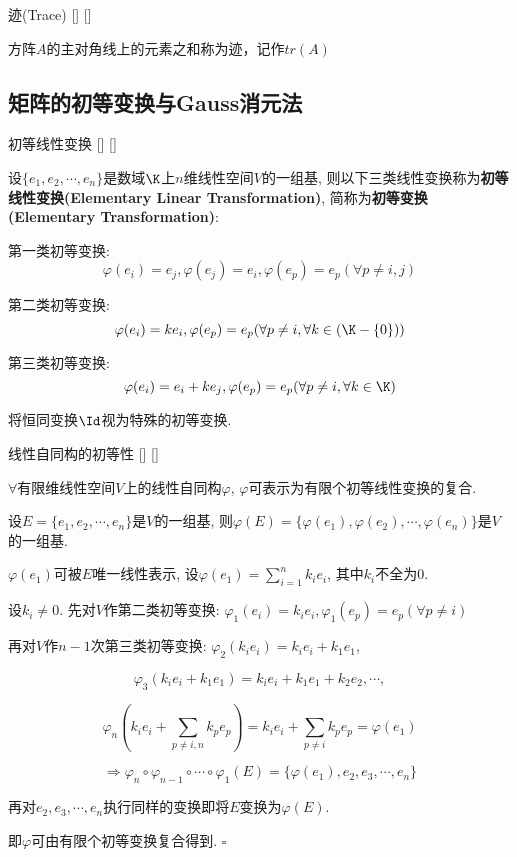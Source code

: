 \documentclass[UTF8]{ctexart}
\begin{document}
		\begin{dfn}
			[]
			{迹(Trace)}
			[]
			[]

            方阵$A$的主对角线上的元素之和称为迹，记作$tr(A)$
		\end{dfn}
		
	\subsection{矩阵的初等变换与Gauss消元法}
	
		\begin{dfn}
			[]
			{初等线性变换}
			[]
			[]

			设$\{e_1,e_2,\cdots,e_n\}$是数域$\K$上$n$维线性空间$V$的一组基, 则以下三类线性变换称为\textbf{初等线性变换(Elementary Linear Transformation)}, 简称为\textbf{初等变换(Elementary Transformation)}: 
			
			第一类初等变换: $$\varphi(e_i)=e_j, \varphi(e_j)=e_i, \varphi(e_p)=e_p(\forall p\neq i,j)$$
			
			第二类初等变换: $$\varphi(e_i)=ke_i, \varphi(e_p)=e_p(\forall p\neq i, \forall k\in(\K-\{0\}))$$
			
			第三类初等变换: $$\varphi(e_i)=e_i+ke_j, \varphi(e_p)=e_p(\forall p\neq i, \forall k\in\K)$$
			
			将恒同变换$\Id$视为特殊的初等变换. 
		\end{dfn}
		
		\begin{ppt}
			[]
			{线性自同构的初等性}
			[]
			[]

			$\forall$有限维线性空间$V$上的线性自同构$\varphi$, $\varphi$可表示为有限个初等线性变换的复合. 
		\end{ppt}
  
		\begin{prf}
			设$E=\{e_1,e_2,\cdots,e_n\}$是$V$的一组基, 则$\varphi(E)=\{\varphi(e_1),\varphi(e_2),\cdots,\varphi(e_n)\}$是$V$的一组基. 
			
			$\varphi(e_1)$可被$E$唯一线性表示, 设$\varphi(e_1)=\sum_{i=1}^{n}k_{i}e_i$, 其中$k_i$不全为$0$. 
			
			设$k_i\neq 0$. 先对$V$作第二类初等变换: $\varphi_1(e_i)=k_ie_i, \varphi_1(e_p)=e_p(\forall p\neq i)$
			
			再对$V$作$n-1$次第三类初等变换: $\varphi_2(k_ie_i)=k_ie_i+k_1e_1$,
			
			$$\varphi_3(k_ie_i+k_1e_1)=k_ie_i+k_1e_1+k_2e_2, \cdots, $$
			
			$$\varphi_n(k_ie_i+\sum_{p\neq i,n}k_pe_p)=k_ie_i+\sum_{p\neq i}k_pe_p=\varphi(e_1)$$
			
			$$\Longrightarrow \varphi_n\circ\varphi_{n-1}\circ\cdots\circ\varphi_1(E)=\{\varphi(e_1),e_2,e_3,\cdots,e_n\}$$
			
			再对$e_2,e_3,\cdots,e_n$执行同样的变换即将$E$变换为$\varphi(E)$. 
			
			即$\varphi$可由有限个初等变换复合得到. $\square$
		\end{prf}
		
\end{document}
